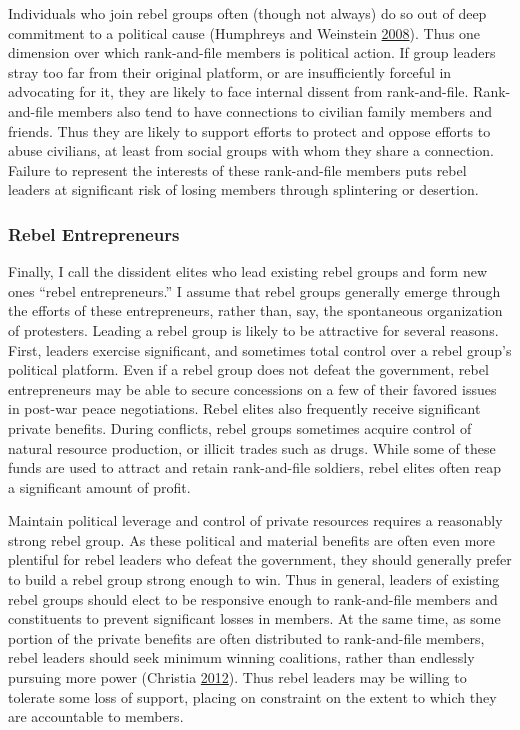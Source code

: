 \documentclass[12pt,]{book}
\theoremstyle{definition}
\theoremstyle{definition}
\theoremstyle{definition}
\theoremstyle{remark}
\begin{document}
Individuals who join rebel groups often (though not always) do so out of
deep commitment to a political cause (Humphreys and Weinstein
\protect\hyperlink{ref-Humphreys2008}{2008}). Thus one dimension over
which rank-and-file members is political action. If group leaders stray
too far from their original platform, or are insufficiently forceful in
advocating for it, they are likely to face internal dissent from
rank-and-file. Rank-and-file members also tend to have connections to
civilian family members and friends. Thus they are likely to support
efforts to protect and oppose efforts to abuse civilians, at least from
social groups with whom they share a connection. Failure to represent
the interests of these rank-and-file members puts rebel leaders at
significant risk of losing members through splintering or desertion.

\hypertarget{rebel-entrepreneurs}{%
\subsubsection*{Rebel Entrepreneurs}\label{rebel-entrepreneurs}}

Finally, I call the dissident elites who lead existing rebel groups and
form new ones ``rebel entrepreneurs.'' I assume that rebel groups
generally emerge through the efforts of these entrepreneurs, rather
than, say, the spontaneous organization of protesters. Leading a rebel
group is likely to be attractive for several reasons. First, leaders
exercise significant, and sometimes total control over a rebel group's
political platform. Even if a rebel group does not defeat the
government, rebel entrepreneurs may be able to secure concessions on a
few of their favored issues in post-war peace negotiations. Rebel elites
also frequently receive significant private benefits. During conflicts,
rebel groups sometimes acquire control of natural resource production,
or illicit trades such as drugs. While some of these funds are used to
attract and retain rank-and-file soldiers, rebel elites often reap a
significant amount of profit.

Maintain political leverage and control of private resources requires a
reasonably strong rebel group. As these political and material benefits
are often even more plentiful for rebel leaders who defeat the
government, they should generally prefer to build a rebel group strong
enough to win. Thus in general, leaders of existing rebel groups should
elect to be responsive enough to rank-and-file members and constituents
to prevent significant losses in members. At the same time, as some
portion of the private benefits are often distributed to rank-and-file
members, rebel leaders should seek minimum winning coalitions, rather
than endlessly pursuing more power (Christia
\protect\hyperlink{ref-Christia2012}{2012}). Thus rebel leaders may be
willing to tolerate some loss of support, placing on constraint on the
extent to which they are accountable to members.
\end{document}
